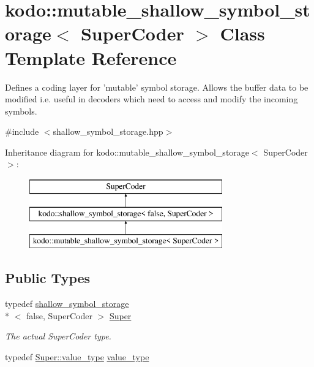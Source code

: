 \hypertarget{classkodo_1_1mutable__shallow__symbol__storage}{\section{kodo\-:\-:mutable\-\_\-shallow\-\_\-symbol\-\_\-storage$<$ Super\-Coder $>$ Class Template Reference}
\label{classkodo_1_1mutable__shallow__symbol__storage}
}


Defines a coding layer for 'mutable' symbol storage. Allows the buffer data to be modified i.\-e. useful in decoders which need to access and modify the incoming symbols.  




{\ttfamily \#include $<$shallow\-\_\-symbol\-\_\-storage.\-hpp$>$}

Inheritance diagram for kodo\-:\-:mutable\-\_\-shallow\-\_\-symbol\-\_\-storage$<$ Super\-Coder $>$\-:\begin{figure}[H]
\begin{center}
\leavevmode
\includegraphics[height=3.000000cm]{classkodo_1_1mutable__shallow__symbol__storage}
\end{center}
\end{figure}
\subsection*{Public Types}
\begin{DoxyCompactItemize}
\item 
\hypertarget{classkodo_1_1mutable__shallow__symbol__storage_a608c692db18e56f7babb7c1df270d53b}{typedef \hyperlink{classkodo_1_1shallow__symbol__storage}{shallow\-\_\-symbol\-\_\-storage}\\*
$<$ false, Super\-Coder $>$ \hyperlink{classkodo_1_1mutable__shallow__symbol__storage_a608c692db18e56f7babb7c1df270d53b}{Super}}\label{classkodo_1_1mutable__shallow__symbol__storage_a608c692db18e56f7babb7c1df270d53b}

\begin{DoxyCompactList}\small\item\em The actual Super\-Coder type. \end{DoxyCompactList}\item 
typedef \hyperlink{classkodo_1_1shallow__symbol__storage_abb7de59459d66e0eeb8a6406b074122f}{Super\-::value\-\_\-type} \hyperlink{classkodo_1_1mutable__shallow__symbol__storage_a9ff10d29f7c81440e2e73cbcdff94d46}{value\-\_\-type}
\begin{DoxyCompactList}\small\item\em \end{DoxyCompactList}\end{DoxyCompactItemize}

